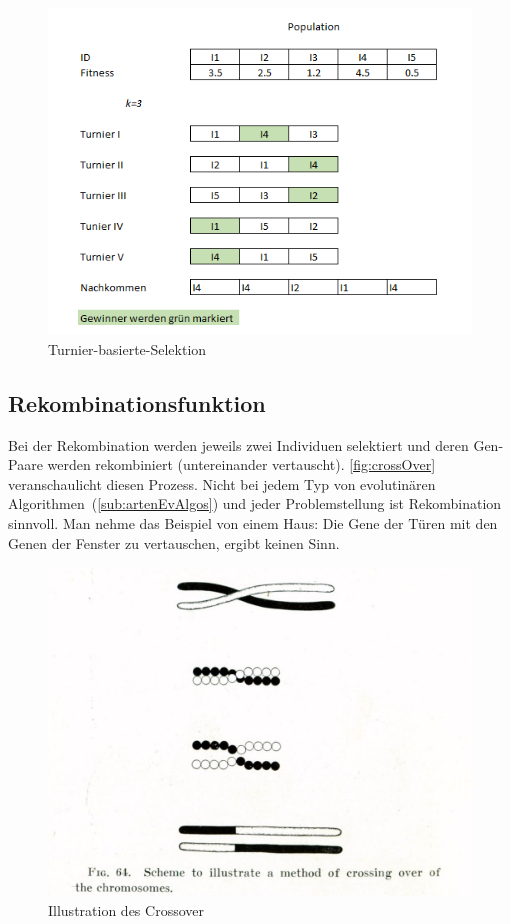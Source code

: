         \begin{figure}[H]
          \includegraphics[scale=1, center]{graphics/tournament_based}
          \caption{Turnier-basierte-Selektion~\label{fig:tournament_based}}
        \end{figure}

    \subsection{Rekombinationsfunktion}

        Bei der Rekombination werden jeweils zwei Individuen selektiert und
        deren Gen-Paare werden rekombiniert (untereinander vertauscht).
        \vref{fig:crossOver} veranschaulicht diesen Prozess.
        Nicht bei jedem Typ von evolutinären Algorithmen~(\vref{sub:artenEvAlgos}) und jeder Problemstellung ist Rekombination sinnvoll.
        Man nehme das Beispiel von einem Haus: Die Gene der Türen mit den Genen der Fenster zu vertauschen, ergibt keinen Sinn.


        \begin{figure}[H]
          \includegraphics[scale=0.3, center]{graphics/morgan_crossover}
          \caption{Illustration des Crossover~\cite[]{WikipediaEN:crossOver}\label{fig:crossOver}}
        \end{figure}

